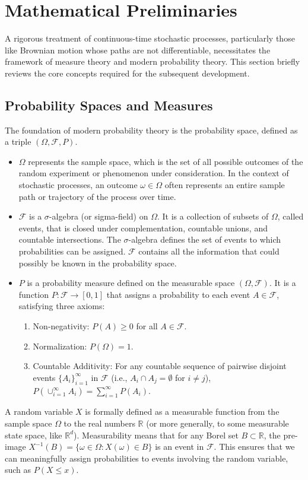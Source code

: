 \documentclass[11pt,twoside,openright]{report}
\begin{document}
\section{Mathematical Preliminaries}
\label{sec:preliminaries}

A rigorous treatment of continuous-time stochastic processes, particularly those like Brownian motion whose paths are not differentiable, necessitates the framework of measure theory and modern probability theory. This section briefly reviews the core concepts required for the subsequent development.

\subsection{Probability Spaces and Measures}
\label{subsec:prob_spaces}

The foundation of modern probability theory is the probability space, defined as a triple $(\Omega, \mathcal{F}, P)$.
\begin{itemize}
    \item $\Omega$ represents the sample space, which is the set of all possible outcomes of the random experiment or phenomenon under consideration. In the context of stochastic processes, an outcome $\omega \in \Omega$ often represents an entire sample path or trajectory of the process over time.
    \item $\mathcal{F}$ is a $\sigma$-algebra (or sigma-field) on $\Omega$. It is a collection of subsets of $\Omega$, called events, that is closed under complementation, countable unions, and countable intersections. The $\sigma$-algebra defines the set of events to which probabilities can be assigned. $\mathcal{F}$ contains all the information that could possibly be known in the probability space.
    \item $P$ is a probability measure defined on the measurable space $(\Omega, \mathcal{F})$. It is a function $P: \mathcal{F} \to [0, 1]$ that assigns a probability to each event $A \in \mathcal{F}$, satisfying three axioms:
        \begin{enumerate}
            \item Non-negativity: $P(A) \ge 0$ for all $A \in \mathcal{F}$.
            \item Normalization: $P(\Omega) = 1$.
            \item Countable Additivity: For any countable sequence of pairwise disjoint events $\{A_i\}_{i=1}^\infty$ in $\mathcal{F}$ (i.e., $A_i \cap A_j = \emptyset$ for $i \neq j$), $P(\cup_{i=1}^\infty A_i) = \sum_{i=1}^\infty P(A_i)$.
        \end{enumerate}
\end{itemize}
A random variable $X$ is formally defined as a measurable function from the sample space $\Omega$ to the real numbers $\mathbb{R}$ (or more generally, to some measurable state space, like $\mathbb{R}^d$). Measurability means that for any Borel set $B \subset \mathbb{R}$, the pre-image $X^{-1}(B) = \{\omega \in \Omega : X(\omega) \in B\}$ is an event in $\mathcal{F}$. This ensures that we can meaningfully assign probabilities to events involving the random variable, such as $P(X \le x)$.
\end{document}
